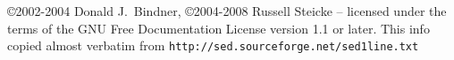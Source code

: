 



\vspace{\fill}
\copyright 2002-2004 Donald J.\ Bindner,
\copyright 2004-2008 Russell Steicke
-- licensed under the terms of the GNU
Free Documentation License version 1.1 or later.
This info copied almost verbatim from
\verb|http://sed.sourceforge.net/sed1line.txt|



